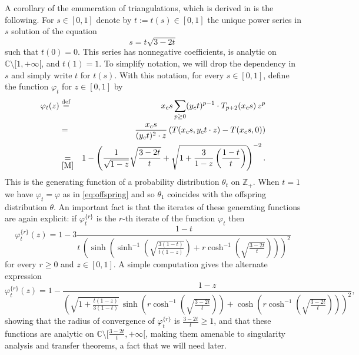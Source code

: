 \documentclass[10pt]{amsart}
\theoremstyle{definition}\newtheorem{defi}[theo]{Definition}\newtheorem{rema}[theo]{Remark}\newtheorem{exam}[theo]{Example}\newtheorem{exem}[theo]{Example}\newtheorem{nota}[theo]{Notation}
\begin{document}
A corollary of the enumeration of triangulations, which is derived in \cite[Section 3.1]{M} is the following. For $s \in [0,1]$ denote by $t := t(s) \in [0,1]$ the unique power series in $s$ solution of the equation
\begin{equation}
\label{eq:paramst}
s = t \sqrt{3-2t}
\end{equation}
such that $t(0) = 0$.
This series has nonnegative coefficients, is analytic on $\mathbb C \setminus [1,+\infty[$, and $t(1)=1$. To simplify notation, we will drop the dependency in $s$ and simply write $t$ for $t(s)$. With this notation, for every $s \in [0,1]$, define the function $\varphi_t$ for $z\in [0,1]$ by
 \begin{eqnarray}
\varphi_t(z) &\overset{ \mathrm{def}}{=}& x_c  s \sum_{p \geq 0}   (y_c  t)^{p-1} \cdot T_{p+2}(x_c  s) \, z^p\nonumber \\  &=& \frac{x_c  s}{(y_c  t)^2 \cdot z} \left( T(x_c  s, y_c  t \cdot z) - T(x_c  s,0) \right)\nonumber \\
& \underset{ \mbox{\cite[Sec. 3.1]{M}} }{=}&  1 - \left( \frac{1}{\sqrt{1-z}} \sqrt{\frac{3 -2t}{t}} + \sqrt{1 + \frac{3}{1-z} \left(\frac{1 -t}{t} \right)}\right)^{-2}. \label{eq:exprPhit} \end{eqnarray}
This is the generating function of a probability distribution $\theta_{t}$ on $\mathbb Z_+$. When $t=1$ we have $\varphi_{t} = \varphi$  as in \eqref{eq:offspring} and so $\theta_{1}$ coincides with the offspring distribution $\theta$. An important  fact \cite[Lemma 3]{M} is that the iterates of these generating functions are again explicit: if $\varphi_t^{\{r\}}$ is the $r$-th iterate of the function $\varphi_t$  then
\begin{equation}
\label{eq:iterPhit}
\varphi_t^{\{ r\}} (z) = 1 - 3 \frac{1-t}{t \, \left( \sinh \left( \sinh^{-1} \left( \sqrt{\frac{3(1-t)}{t(1-z)}}\right) + r \cosh^{-1} \left(\sqrt{\frac{3-2t}{t}} \right) \right) \right)^2}
\end{equation}
for every $r \geq 0$ and $z \in [0,1]$. A simple computation gives the alternate expression
\[
\varphi_t^{\{r\}} (z) = 1- \frac{1-z}{
\left(
\sqrt{1+\frac{t(1-z)}{3(1-t)}} \,
\sinh \left( r \cosh^{-1} \left(\sqrt{\frac{3-2t}{t}}\right) \right)
+
\cosh \left( r \cosh^{-1} \left(\sqrt{\frac{3-2t}{t}}\right) \right)
\right)^2},
\]
showing that the radius of convergence of $\varphi_t^{\{r\}}$ is $\frac{3-2t}{t} \geq 1$, and that these functions are analytic on $\mathbb C \setminus [\frac{3-2t}{t} , + \infty[$, making them amenable to singularity analysis and transfer theorems, a fact that we will need later.
\end{document}
